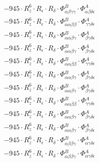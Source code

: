 \documentclass{article}
\begin{document}
\begin{subequations}
\begin{gather}
\begin{array}{c}
 \\[0.2em] 		 - 945 \cdot R_{z}^{6} \cdot R_{\epsilon{}} \cdot R_{\delta{}} \cdot \Phi{}^{B}_{\alpha{}\beta{}\gamma{}\gamma{}} \cdot \Phi{}^{A}_{\alpha{}\beta{}\delta{}\epsilon{}} 
 \\[0.2em] 		 - 945 \cdot R_{z}^{6} \cdot R_{\epsilon{}} \cdot R_{\delta{}} \cdot \Phi{}^{B}_{\alpha{}\alpha{}\beta{}\beta{}} \cdot \Phi{}^{A}_{\gamma{}\gamma{}\delta{}\epsilon{}} 
 \\[0.2em] 		 - 945 \cdot R_{z}^{6} \cdot R_{\epsilon{}} \cdot R_{\delta{}} \cdot \Phi{}^{B}_{\alpha{}\alpha{}\beta{}\gamma{}} \cdot \Phi{}^{A}_{\beta{}\gamma{}\delta{}\epsilon{}} 
 \\[0.2em] 		 - 945 \cdot R_{z}^{6} \cdot R_{\epsilon{}} \cdot R_{\delta{}} \cdot \Phi{}^{B}_{\alpha{}\alpha{}\beta{}\gamma{}} \cdot \Phi{}^{A}_{\beta{}\gamma{}\delta{}\epsilon{}} 
 \\[0.2em] 		 - 945 \cdot R_{z}^{6} \cdot R_{\epsilon{}} \cdot R_{\delta{}} \cdot \Phi{}^{B}_{\alpha{}\alpha{}\beta{}\beta{}} \cdot \Phi{}^{A}_{\gamma{}\gamma{}\delta{}\epsilon{}} 
 \\[0.2em] 		 - 945 \cdot R_{z}^{6} \cdot R_{\epsilon{}} \cdot R_{\delta{}} \cdot \Phi{}^{B}_{\alpha{}\alpha{}\beta{}\gamma{}} \cdot \Phi{}^{A}_{\beta{}\gamma{}\delta{}\epsilon{}} 
 \\[0.2em] 		 - 945 \cdot R_{z}^{6} \cdot R_{\epsilon{}} \cdot R_{\delta{}} \cdot \Phi{}^{B}_{\alpha{}\alpha{}\beta{}\gamma{}} \cdot \Phi{}^{A}_{\beta{}\gamma{}\delta{}\epsilon{}} 
 \\[0.2em] 		 - 945 \cdot R_{z}^{6} \cdot R_{\epsilon{}} \cdot R_{\delta{}} \cdot \Phi{}^{B}_{\alpha{}\alpha{}\beta{}\beta{}} \cdot \Phi{}^{A}_{\gamma{}\gamma{}\delta{}\epsilon{}} 
 \\[0.2em] 		 - 945 \cdot R_{z}^{6} \cdot R_{\epsilon{}} \cdot R_{\delta{}} \cdot \Phi{}^{B}_{\alpha{}\alpha{}\beta{}\gamma{}} \cdot \Phi{}^{A}_{\beta{}\gamma{}\delta{}\epsilon{}} 
 \\[0.2em] 		 - 945 \cdot R_{z}^{6} \cdot R_{\epsilon{}} \cdot R_{\delta{}} \cdot \Phi{}^{B}_{\alpha{}\alpha{}\beta{}\gamma{}} \cdot \Phi{}^{A}_{\beta{}\gamma{}\delta{}\epsilon{}} 
 \\[0.2em] 		 - 945 \cdot R_{z}^{6} \cdot R_{\epsilon{}} \cdot R_{\delta{}} \cdot \Phi{}^{B}_{\alpha{}\beta{}\beta{}\gamma{}} \cdot \Phi{}^{A}_{\alpha{}\gamma{}\delta{}\epsilon{}} 
 \\[0.2em] 		 - 945 \cdot R_{z}^{6} \cdot R_{\epsilon{}} \cdot R_{\delta{}} \cdot \Phi{}^{B}_{\alpha{}\beta{}\beta{}\gamma{}} \cdot \Phi{}^{A}_{\alpha{}\gamma{}\delta{}\epsilon{}} 

\end{array}
\end{gather}
\end{subequations}
\end{document}
